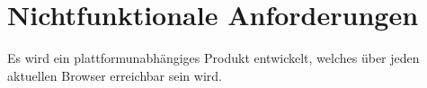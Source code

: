 \section{Nichtfunktionale Anforderungen}

    Es wird ein plattformunabhängiges Produkt entwickelt, welches über jeden aktuellen Browser erreichbar sein wird.